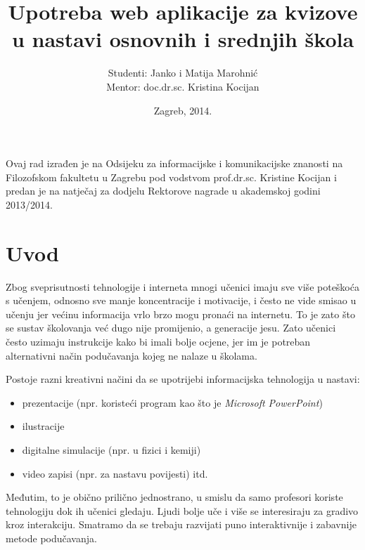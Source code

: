 \documentclass{scrreprt}
\begin{document}
\titlehead{}
\title{Upotreba web aplikacije za kvizove u nastavi osnovnih i srednjih škola}
\author{Studenti: Janko i Matija Marohnić\\Mentor: doc.dr.sc. Kristina Kocijan}
\date{Zagreb, 2014.}

\maketitle

\pagebreak

Ovaj rad izrađen je na Odsijeku za informacijske i komunikacijske znanosti na
Filozofskom fakultetu u Zagrebu pod vodstvom prof.dr.sc. Kristine Kocijan i
predan je na natječaj za dodjelu Rektorove nagrade u akademskoj godini
2013/2014.

\pagebreak

\tableofcontents

\chapter{Uvod}

Zbog sveprisutnosti tehnologije i interneta mnogi učenici imaju sve više
poteškoća s učenjem, odnosno sve manje koncentracije i motivacije, i često ne
vide smisao u učenju jer većinu informacija vrlo brzo mogu pronaći na internetu.
To je zato što se sustav školovanja već dugo nije promijenio, a generacije
jesu.\cite{perisic13} Zato učenici često uzimaju instrukcije kako bi imali bolje
ocjene, jer im je potreban alternativni način podučavanja kojeg ne nalaze u
školama.

Postoje razni kreativni načini da se upotrijebi informacijska tehnologija u
nastavi:

\begin{itemize}
  \item prezentacije (npr. koristeći program kao što je \emph{Microsoft
    PowerPoint})
  \item ilustracije
  \item digitalne simulacije (npr. u fizici i kemiji)
  \item video zapisi (npr. za nastavu povijesti) itd.
\end{itemize}

Međutim, to je obično prilično jednostrano, u smislu da samo profesori koriste
tehnologiju dok ih učenici gledaju. Ljudi bolje uče i više se interesiraju za
gradivo kroz interakciju. Smatramo da se trebaju razvijati puno interaktivnije i
zabavnije metode podučavanja.
\end{document}
